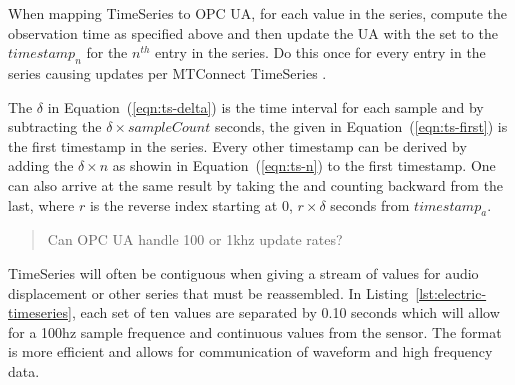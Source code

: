 When mapping \gls{TimeSeries} to OPC UA, for each value in the series, compute the observation time as specified above and then update the UA  with the  set to the $timestamp_n$ for the $n^{th}$ entry in the series. Do this once for every entry in the series causing  updates per MTConnect \gls{TimeSeries} .

The $\delta$ in Equation~(\ref{eqn:ts-delta}) is the time interval for each sample and by subtracting the $\delta \times sampleCount$ seconds, the given in Equation~(\ref{eqn:ts-first}) is the first timestamp in the series. Every other timestamp can be derived by adding the $\delta \times n$ as showin in Equation~(\ref{eqn:ts-n}) to the first timestamp. One can also arrive at the same result by taking the  and counting backward from the last, where $r$ is the reverse index starting at 0, $r \times \delta$ seconds from $timestamp_a$.

\begin{quote}
  \color{red} Can OPC UA handle 100 or 1khz update rates?
\end{quote}

\gls{TimeSeries}  will often be contiguous when giving a stream of values for audio displacement or other series that must be reassembled. In Listing~\ref{lst:electric-timeseries}, each set of ten values are separated by 0.10 seconds which will allow for a 100hz sample frequence and continuous values from the sensor. The format is more efficient and allows for communication of waveform and high frequency data.

